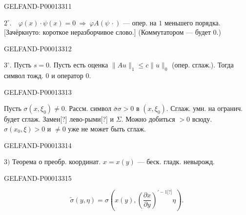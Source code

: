 \begin{GelfandAdjacentEvidence}{GELFAND-P000133}{11}

$2^\circ.\quad\varphi(x)\cdot\psi(x)=0\ \Rightarrow\ \varphi A(\psi\,\cdot)$ — опер. на $1$ меньшего порядка. [Зачёркнуто: короткое неразборчивое слово.] (Коммутатором — будет $0$.)
\end{GelfandAdjacentEvidence}
\begin{GelfandAdjacentEvidence}{GELFAND-P000133}{12}

$3^\circ$. Пусть $s=0$. Пусть есть оценка $\|Au\|_1\le c\|u\|_0$ (опер. сглаж.). Тогда символ тожд. $0$ и оператор $0$.
\end{GelfandAdjacentEvidence}
\begin{GelfandAdjacentEvidence}{GELFAND-P000133}{13}

Пусть $\sigma(x,\xi_0)\ne0$. Рассм. символ $\bar\sigma\sigma>0$ в $(x,\xi_0)$. Сглаж. умн. на огранич. будет сглаж. Замен[?] лево-рыми[?] и $\Sigma$. Можно добиться $>0$ всюду.
$\sigma(x_0,\xi)>0$ и $\ne0$ уже не может быть сглаж.
\end{GelfandAdjacentEvidence}
\begin{GelfandAdjacentEvidence}{GELFAND-P000133}{14}


$3)$ Теорема о преобр. координат. $x=x(y)$ — беск. гладк. невырожд.
\end{GelfandAdjacentEvidence}
\begin{GelfandAdjacentEvidence}{GELFAND-P000133}{15}

\begin{equation*}\tilde\sigma(y,\eta)=\sigma\left(x(y),\left(\frac{\partial x}{\partial y}\right)^{\prime-1\text{[?]}}\eta\right).\end{equation*}
\end{GelfandAdjacentEvidence}




